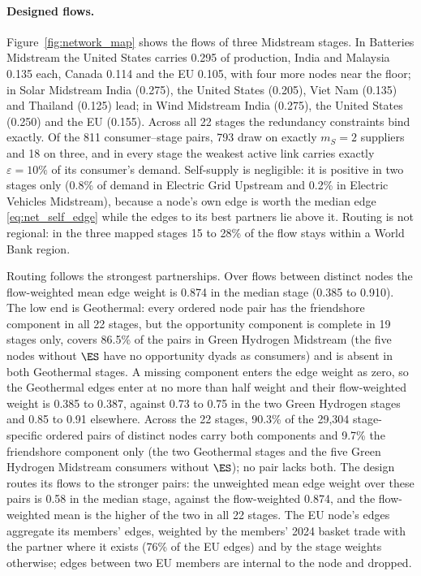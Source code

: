 

\paragraph{Designed flows.} Figure~\ref{fig:network_map} shows the flows of three Midstream
stages. In Batteries Midstream the United States carries 0.295 of production, India and Malaysia
0.135 each, Canada 0.114 and the EU 0.105, with four more nodes near the floor; in Solar
Midstream India (0.275), the United States (0.205), Viet Nam (0.135) and Thailand (0.125) lead;
in Wind Midstream India (0.275), the United States (0.250) and the EU (0.155). Across all 22
stages the redundancy constraints bind exactly. Of the 811 consumer--stage pairs, 793 draw on
exactly $m_S=2$ suppliers and 18 on three, and in every stage the weakest active link carries
exactly $\varepsilon=10\%$ of its consumer's demand. Self-supply is negligible: it is positive in
two stages only (0.8\% of demand in Electric Grid Upstream and 0.2\% in Electric Vehicles
Midstream), because a node's own edge is worth the median edge \eqref{eq:net_self_edge} while the
edges to its best partners lie above it. Routing is not regional: in the three mapped stages 15
to 28\% of the flow stays within a World Bank region.

Routing follows the strongest partnerships. Over flows between distinct nodes the flow-weighted
mean edge weight is 0.874 in the median stage (0.385 to 0.910). The low end is Geothermal: every
ordered node pair has the friendshore component in all 22 stages, but the opportunity component
is complete in 19 stages only, covers 86.5\% of the pairs in Green Hydrogen Midstream (the five
nodes without $\ES$ have no opportunity dyads as consumers) and is absent in both Geothermal
stages. A missing component enters the edge weight as zero, so the Geothermal edges enter at no
more than half weight and their flow-weighted weight is 0.385 to 0.387, against 0.73 to 0.75 in
the two Green Hydrogen stages and 0.85 to 0.91 elsewhere. Across the 22 stages,
90.3\% of the 29{,}304 stage-specific ordered pairs of distinct nodes carry both
components and 9.7\% the friendshore component only (the two Geothermal stages and the five Green
Hydrogen Midstream consumers without $\ES$); no pair lacks both. The design routes its flows to
the stronger pairs: the unweighted mean edge weight over these pairs is 0.58 in the median stage,
against the flow-weighted 0.874, and the flow-weighted mean is the higher of the two in all 22
stages. The EU node's edges aggregate its members' edges, weighted by the members' 2024
basket trade with the partner where it exists (76\% of the EU edges) and by the stage weights
otherwise; edges between two EU members are internal to the node and dropped.

